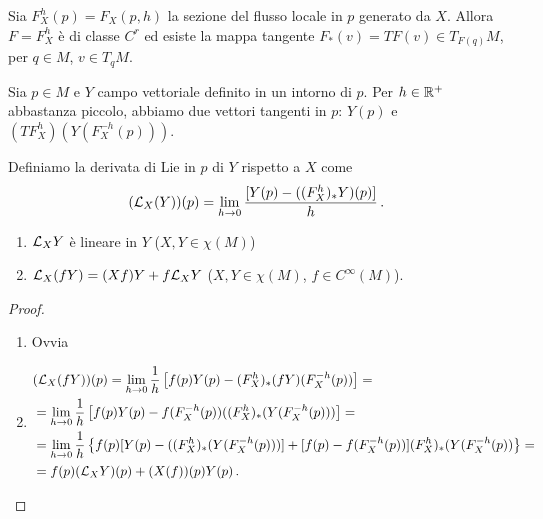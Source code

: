 Sia $F_X^h(p)=F_X(p,h)$ la sezione del flusso locale in $p$ generato da $X$. Allora $F=F_X^h$ è di classe $C^r$ ed esiste la mappa tangente $F_*(v)=TF(v)\in T_{F(q)}M$, per $q\in M$, $v\in T_qM$.

Sia $p\in M$ e $Y$ campo vettoriale definito in un intorno di $p$. Per $h\in\mathbb R^+$ abbastanza piccolo, abbiamo due vettori tangenti in $p$: $Y(p)$ e $(TF_X^h)(Y(F_X^{-h}(p)))$.

\begin{definition}
	Definiamo la derivata di Lie in $p$ di $Y$ rispetto a $X$ come \begin{equation*}(\mathcal L_X(Y))(p)=\lim_{h\to 0}\frac{[Y(p)-((F_X^h)_*Y)(p)]}h \, \text{. }
	\end{equation*}
\end{definition}

\begin{proposition}
	\begin{enumerate}
		\item $\mathcal L_XY$ è lineare in $Y$ ($X,Y\in\chi(M)$)
		\item $\mathcal L_X(fY)=(Xf)Y+f\mathcal L_XY$ ($X,Y\in\chi(M)$, $f\in C^\infty(M)$).
	\end{enumerate}
\end{proposition}

\begin{proof}
	\begin{enumerate}
	 \item Ovvia
	 \item 
	 \begin{equation*}
	 \begin{split}
	 &(\mathcal L_X(fY))(p)=\lim_{h\to 0} \frac 1h \left[f(p)Y(p)-(F_X^h)_*(fY)(F_X^{-h}(p))\right]=\\
	 &=\lim_{h\to 0}\frac 1h \left[f(p)Y(p)-f(F_X^{-h}(p)) ((F_X^h)_*(Y(F_X^{-h}(p)))\right]=\\
	 &=\lim_{h\to 0}\frac 1h \left\{f(p)[Y(p)-((F_X^h)_*(Y(F_X^{-h}(p)))]+[f(p)-f(F_X^{-h}(p))](F_X^h)_*(Y(F_X^{-h}(p))\right\}=\\
	 &=f(p)(\mathcal L_XY)(p)+(X(f))(p)Y(p) \, \text{. }
	 \end{split}
	 \end{equation*}
	 \end{enumerate}

\end{proof}




